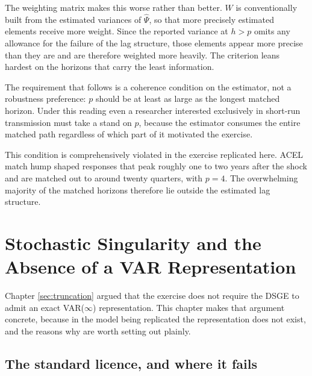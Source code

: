 The weighting matrix makes this worse rather than better. $W$ is conventionally built from the
estimated variances of $\hat{\Psi}$, so that more precisely estimated elements receive more
weight. Since the reported variance at $h > p$ omits any allowance for the failure of the
lag structure, those elements appear more precise than they are and are therefore weighted
more heavily. The criterion leans hardest on the horizons that carry the least information.

The requirement that follows is a coherence condition on the estimator, not a robustness
preference: $p$ should be at least as large as the longest matched horizon. Under this reading
even a researcher interested exclusively in short-run transmission must take a stand on $p$,
because the estimator consumes the entire matched path regardless of which part of it motivated
the exercise.

This condition is comprehensively violated in the exercise replicated here. ACEL match hump
shaped responses that peak roughly one to two years after the shock and are matched out to
around twenty quarters, with $p=4$. The overwhelming majority of the matched horizons therefore
lie outside the estimated lag structure. 

\section{Stochastic Singularity and the Absence of a VAR Representation}
\label{sec:Stochastic}

Chapter \ref{sec:truncation} argued that the exercise does not require the DSGE to admit an
exact VAR($\infty$) representation. This chapter makes that argument concrete, because in the
model being replicated the representation does not exist, and the reasons why are worth
setting out plainly.

\subsection{The standard licence, and where it fails}

